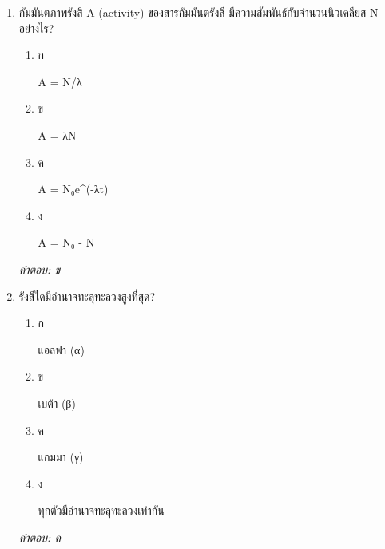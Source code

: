 \documentclass[12pt]{article}
\begin{document}
\begin{enumerate}[label=\arabic*., itemsep=0.5\baselineskip, topsep=0.5\baselineskip, leftmargin=*]
\item กัมมันตภาพรังสี A (activity) ของสารกัมมันตรังสี มีความสัมพันธ์กับจำนวนนิวเคลียส N อย่างไร?
\begin{enumerate}[label=\alph*)., itemsep=0.3\baselineskip, topsep=0.3\baselineskip]
\item ก\ 
\begin{minipage}[t]{0.9\linewidth}
\raggedright A = N/λ
\end{minipage}
\item ข\ 
\begin{minipage}[t]{0.9\linewidth}
\raggedright A = λN
\end{minipage}
\item ค\ 
\begin{minipage}[t]{0.9\linewidth}
\raggedright A = N₀e\textasciicircum{}(-λt)
\end{minipage}
\item ง\ 
\begin{minipage}[t]{0.9\linewidth}
\raggedright A = N₀ - N
\end{minipage}
\end{enumerate}
\vspace{-0.3\baselineskip}
\begin{small}
\textit{คำตอบ: ข}
\end{small}

\item รังสีใดมีอำนาจทะลุทะลวงสูงที่สุด?
\begin{enumerate}[label=\alph*)., itemsep=0.3\baselineskip, topsep=0.3\baselineskip]
\item ก\ 
\begin{minipage}[t]{0.9\linewidth}
\raggedright แอลฟา (α)
\end{minipage}
\item ข\ 
\begin{minipage}[t]{0.9\linewidth}
\raggedright เบต้า (β)
\end{minipage}
\item ค\ 
\begin{minipage}[t]{0.9\linewidth}
\raggedright แกมมา (γ)
\end{minipage}
\item ง\ 
\begin{minipage}[t]{0.9\linewidth}
\raggedright ทุกตัวมีอำนาจทะลุทะลวงเท่ากัน
\end{minipage}
\end{enumerate}
\vspace{-0.3\baselineskip}
\begin{small}
\textit{คำตอบ: ค}
\end{small}


\end{enumerate}
\end{document}
